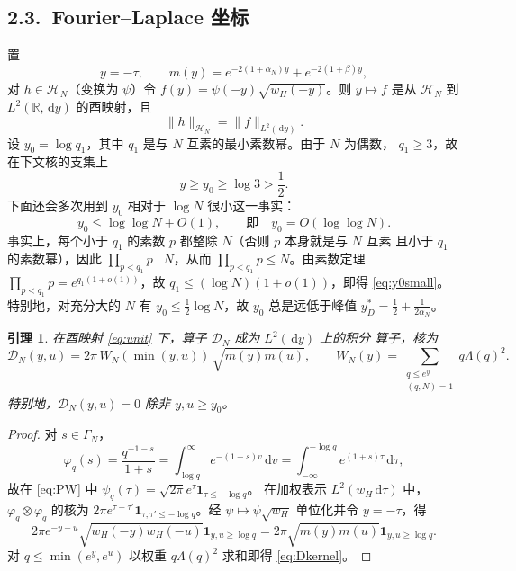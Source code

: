 \documentclass[12pt,a4paper]{amsart}
\numberwithin{equation}{section}
\theoremstyle{plain}
\newtheorem{lemma}[theorem]{引理}
\theoremstyle{definition}
\newcommand{\dd}{\,\mathrm{d}}
\begin{document}
\subsection*{2.3.\ Fourier--Laplace 坐标}

置
\begin{equation}\label{eq:m}
 y=-\tau,\qquad m(y)=e^{-2(1+\alpha_N)y}+e^{-2(1+\beta)y},
\end{equation}
对 $h\in\mathcal H_N$（变换为 $\psi$）令 $f(y)=\psi(-y)\sqrt{w_H(-y)}$。则
$y\mapsto f$ 是从 $\mathcal H_N$ 到 $L^2(\mathbb R,\dd y)$ 的酉映射，且
\begin{equation}\label{eq:unit}
 \|h\|_{\mathcal H_N}=\|f\|_{L^2(\dd y)} .
\end{equation}
设 $y_0=\log q_1$，其中 $q_1$ 是与 $N$ 互素的最小素数幂。由于 $N$ 为偶数，
$q_1\ge3$，故在下文核的支集上
\begin{equation}\label{eq:y0}
 y\ge y_0\ge\log3>\frac12 .
\end{equation}
下面还会多次用到 $y_0$ 相对于 $\log N$ 很小这一事实：
\begin{equation}\label{eq:y0small}
 y_0\le\log\log N+O(1),\qquad\text{即}\quad y_0=O(\log\log N).
\end{equation}
事实上，每个小于 $q_1$ 的素数 $p$ 都整除 $N$（否则 $p$ 本身就是与 $N$ 互素
且小于 $q_1$ 的素数幂），因此 $\prod_{p<q_1}p\mid N$，从而
$\prod_{p<q_1}p\le N$。由素数定理 $\prod_{p<q_1}p=e^{q_1(1+o(1))}$，故
$q_1\le(\log N)(1+o(1))$，即得 \eqref{eq:y0small}。特别地，对充分大的 $N$ 有
$y_0\le\frac12\log N$，故 $y_0$ 总是远低于峰值
$y_D^*=\frac12+\frac1{2\alpha_N}$。

\begin{lemma}\label{lem:FL}
在酉映射 \eqref{eq:unit} 下，算子 $\mathcal D_N$ 成为 $L^2(\dd y)$ 上的积分
算子，核为
\begin{equation}\label{eq:Dkernel}
 \mathscr D_N(y,u)=2\pi\,W_N(\min(y,u))\,\sqrt{m(y)m(u)},
 \qquad
 W_N(y)=\sum_{\substack{q\le e^y\\(q,N)=1}}q\Lambda(q)^2 .
\end{equation}
特别地，$\mathscr D_N(y,u)=0$ 除非 $y,u\ge y_0$。
\end{lemma}

\begin{proof}
对 $s\in\Gamma_N$，
\[
 \varphi_q(s)=\frac{q^{-1-s}}{1+s}=\int_{\log q}^{\infty}e^{-(1+s)v}\dd v
 =\int_{-\infty}^{-\log q}e^{(1+s)\tau}\dd\tau,
\]
故在 \eqref{eq:PW} 中 $\psi_q(\tau)=\sqrt{2\pi}e^{\tau}\mathbf 1_{\tau\le-\log q}$。
在加权表示 $L^2(w_H\dd\tau)$ 中，$\varphi_q\otimes\varphi_q$ 的核为
$2\pi e^{\tau+\tau'}\mathbf 1_{\tau,\tau'\le-\log q}$。经 $\psi\mapsto\psi\sqrt{w_H}$
单位化并令 $y=-\tau$，得
\[
 2\pi e^{-y-u}\sqrt{w_H(-y)w_H(-u)}\mathbf 1_{y,u\ge\log q}
 =2\pi\sqrt{m(y)m(u)}\mathbf 1_{y,u\ge\log q} .
\]
对 $q\le\min(e^y,e^u)$ 以权重 $q\Lambda(q)^2$ 求和即得 \eqref{eq:Dkernel}。
\end{proof}
\end{document}
